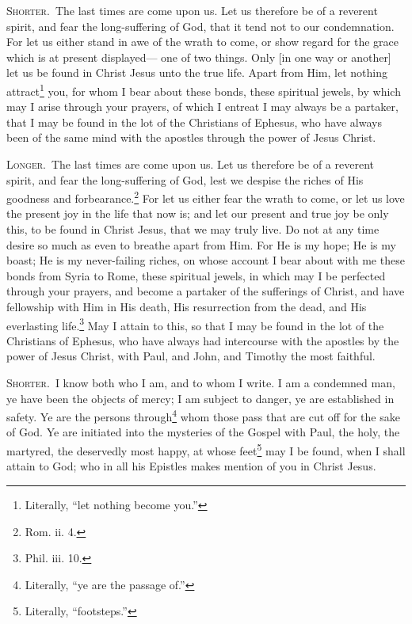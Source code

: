 
\textsc{Shorter.}~The last times are come upon us. Let us therefore be of a reverent spirit, and fear the long-suffering of God, that it tend not to our condemnation. For let us either stand in awe of the wrath to come, or show regard for the grace which is at present displayed— one of two things. Only [in one way or another] let us be found in Christ Jesus unto the true life. Apart from Him, let nothing attract\footnote{Literally, “let nothing become you.”} you, for whom I bear about these bonds, these spiritual jewels, by which may I arise through your prayers, of which I entreat I may always be a partaker, that I may be found in the lot of the Christians of Ephesus, who have always been of the same mind with the apostles through the power of Jesus Christ.

\textsc{Longer.}~The last times are come upon us. Let us therefore be of a reverent spirit, and fear the long-suffering of God, lest we despise the riches of His goodness and forbearance.\footnote{Rom. ii. 4.} For let us either fear the wrath to come, or let us love the present joy in the life that now is; and let our present and true joy be only this, to be found in Christ Jesus, that we may truly live. Do not at any time desire so much as even to breathe apart from Him. For He is my hope; He is my boast; He is my never-failing riches, on whose account I bear about with me these bonds from Syria to Rome, these spiritual jewels, in which may I be perfected through your prayers, and become a partaker of the sufferings of Christ, and have fellowship with Him in His death, His resurrection from the dead, and His everlasting life.\footnote{Phil. iii. 10.} May I attain to this, so that I may be found in the lot of the Christians of Ephesus, who have always had intercourse with the apostles by the power of Jesus Christ, with Paul, and John, and Timothy the most faithful.


\textsc{Shorter.}~I know both who I am, and to whom I write. I am a condemned man, ye have been the objects of  mercy; I am subject to danger, ye are established in safety. Ye are the persons through\footnote{Literally, “ye are the passage of.”} whom those pass that are cut off for the sake of God. Ye are initiated into the mysteries of the Gospel with Paul, the holy, the martyred, the deservedly most happy, at whose feet\footnote{Literally, “footsteps.”} may I be found, when I shall attain to God; who in all his Epistles makes mention of you in Christ Jesus.

